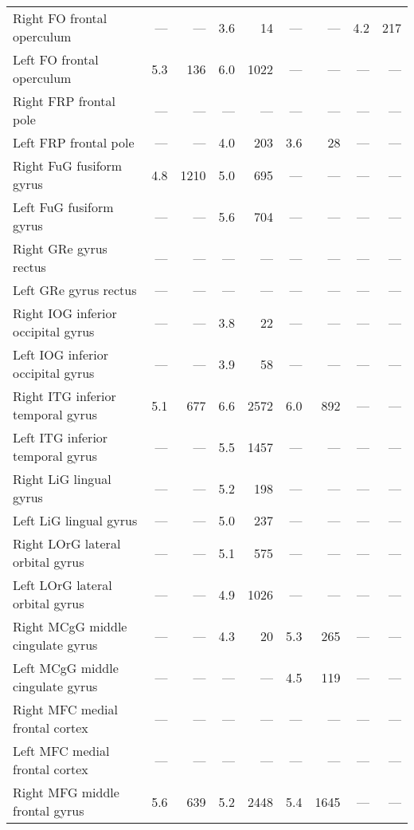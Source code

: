 \documentclass[]{article}
\begin{document}
\begin{table}[ht]
{\begin{tabular}{lrrrrrrrr}
  Right FO    frontal operculum & --- & --- & 3.6 & 14 & --- & --- & 4.2 & 217 \\ 
  Left FO    frontal operculum & 5.3 & 136 & 6.0 & 1022 & --- & --- & --- & --- \\ 
  Right FRP   frontal pole & --- & --- & --- & --- & --- & --- & --- & --- \\ 
  Left FRP   frontal pole & --- & --- & 4.0 & 203 & 3.6 & 28 & --- & --- \\ 
  Right FuG   fusiform gyrus & 4.8 & 1210 & 5.0 & 695 & --- & --- & --- & --- \\ 
  Left FuG   fusiform gyrus & --- & --- & 5.6 & 704 & --- & --- & --- & --- \\ 
  Right GRe   gyrus rectus & --- & --- & --- & --- & --- & --- & --- & --- \\ 
  Left GRe   gyrus rectus & --- & --- & --- & --- & --- & --- & --- & --- \\ 
  Right IOG   inferior occipital gyrus & --- & --- & 3.8 & 22 & --- & --- & --- & --- \\ 
  Left IOG   inferior occipital gyrus & --- & --- & 3.9 & 58 & --- & --- & --- & --- \\ 
  Right ITG   inferior temporal gyrus & 5.1 & 677 & 6.6 & 2572 & 6.0 & 892 & --- & --- \\ 
  Left ITG   inferior temporal gyrus & --- & --- & 5.5 & 1457 & --- & --- & --- & --- \\ 
  Right LiG   lingual gyrus & --- & --- & 5.2 & 198 & --- & --- & --- & --- \\ 
  Left LiG   lingual gyrus & --- & --- & 5.0 & 237 & --- & --- & --- & --- \\ 
  Right LOrG  lateral orbital gyrus & --- & --- & 5.1 & 575 & --- & --- & --- & --- \\ 
  Left LOrG  lateral orbital gyrus & --- & --- & 4.9 & 1026 & --- & --- & --- & --- \\ 
  Right MCgG  middle cingulate gyrus & --- & --- & 4.3 & 20 & 5.3 & 265 & --- & --- \\ 
  Left MCgG  middle cingulate gyrus & --- & --- & --- & --- & 4.5 & 119 & --- & --- \\ 
  Right MFC   medial frontal cortex & --- & --- & --- & --- & --- & --- & --- & --- \\ 
  Left MFC   medial frontal cortex & --- & --- & --- & --- & --- & --- & --- & --- \\ 
  Right MFG   middle frontal gyrus & 5.6 & 639 & 5.2 & 2448 & 5.4 & 1645 & --- & --- \\ 

\end{tabular}}
\end{table}
\end{document}
